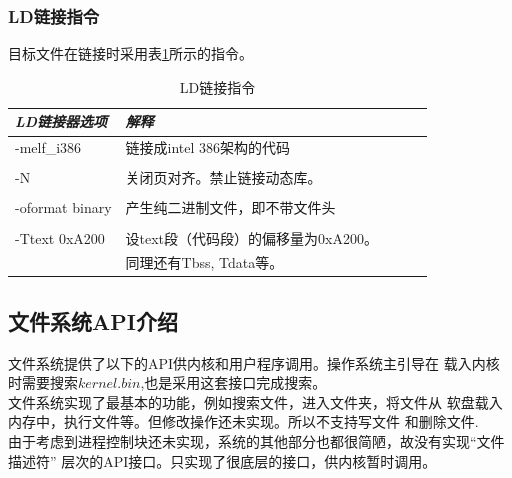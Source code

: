 \documentclass[a4paper]{article}
\begin{document}
    \subsubsection{LD链接指令}
    目标文件在链接时采用表\ref{tab:ld}所示的指令。
    \begin{table}[!hbt]
        \caption{LD链接指令}\label{tab:ld}
    \begin{tabular}{@{} *5l @{}}    
        \toprule
    \emph{LD链接器选项} & \emph{解释} &&&  \\
        \midrule
        -melf\_i386    & 链接成intel 386架构的代码 \\ 
        \\ 
        -N & 关闭页对齐。禁止链接动态库。\\
        \\
        -oformat binary & 产生纯二进制文件，即不带文件头 \\
        \\
        -Ttext 0xA200 & 设text段（代码段）的偏移量为0xA200。
            \\& 同理还有Tbss, Tdata等。 \\
        \bottomrule
    \hline
    \end{tabular}
    \end{table}

    \subsection{文件系统API介绍}
    文件系统提供了以下的API供内核和用户程序调用。操作系统主引导在
    载入内核时需要搜索$kernel.bin$,也是采用这套接口完成搜索。\\

    文件系统实现了最基本的功能，例如搜索文件，进入文件夹，将文件从
    软盘载入内存中，执行文件等。但修改操作还未实现。所以不支持写文件
    和删除文件.\\ 

    由于考虑到进程控制块还未实现，系统的其他部分也都很简陋，故没有实现``文件描述符''
    层次的API接口。只实现了很底层的接口，供内核暂时调用。\\
    
\end{document}
